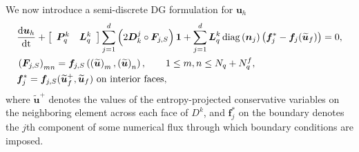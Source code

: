 \documentclass[preprint,10pt]{article}
\theoremstyle{definition}
\theoremstyle{lemma}
\theoremstyle{theorem}
\theoremstyle{assumption}
\DeclareMathOperator{\diag}{diag}
\renewcommand{\tilde}{\widetilde}
\newcommand{\td}[2]{\frac{{\rm d}#1}{{\rm d}{\rm #2}}}
\newcommand{\LRp}[1]{\left( #1 \right)}
\newcommand{\LRs}[1]{\left[ #1 \right]}
\begin{document}
{We now introduce a semi-discrete DG formulation for $\bm{u}_h$
\begin{align}
&\td{\bm{u}_h}{t} + \LRs{\begin{array}{cc}\bm{P}^k_q & \bm{L}^k_q\end{array}}
  \sum_{j=1}^d \LRp{2\bm{D}^j_k \circ \bm{F}_{j,S}}\bm{1} + \sum_{j=1}^d \bm{L}^k_q \diag\LRp{\bm{n}_j}\LRp{\bm{f}_j^* - \bm{f}_j(\tilde{\bm{u}}_f)} = 0,\label{eq:dgform1}\\
  &\LRp{\bm{F}_{j,S}}_{mn} = \bm{f}_{j,S}\LRp{\LRp{\tilde{\bm{u}}}_m,\LRp{\tilde{\bm{u}}}_n}, \qquad 1 \leq m,n \leq N_q + N^f_q,\nonumber\\
  &\bm{f}_j^* = \bm{f}_{j,S}(\tilde{\bm{u}}_f^+,\tilde{\bm{u}}_f) \text{ on interior faces},\nonumber
\end{align}
where $\tilde{\bm{u}}^+$ denotes the values of the entropy-projected conservative variables on the neighboring element across each face of $D^k$, and $\bm{f}_j^*$ on the boundary denotes the $j$th component of some numerical flux through which boundary conditions are imposed.

}
\end{document}

